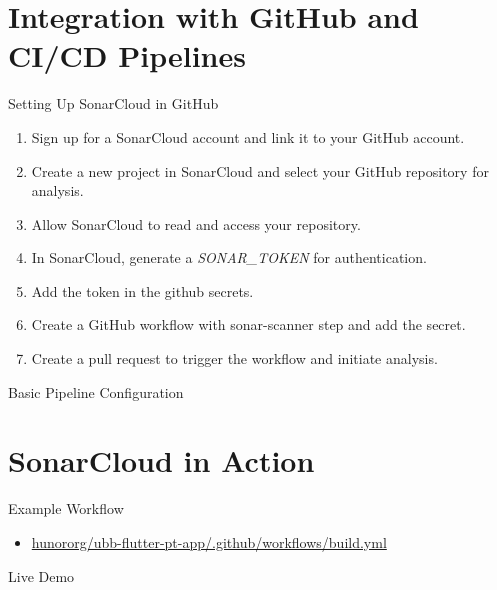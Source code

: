\documentclass{beamer}
\begin{document}
\section[ Integration with GitHub and CI/CD Pipelines]{Integration with GitHub and CI/CD Pipelines}

\begin{frame}{Setting Up SonarCloud in GitHub}
  
  \begin{enumerate}
    \item Sign up for a SonarCloud account and link it to your GitHub account.
    \item Create a new project in SonarCloud and select your GitHub repository for analysis.
    \item Allow SonarCloud to read and access your repository.
    \item In SonarCloud, generate a \small{\textit{SONAR\_TOKEN}} \normalsize for authentication.
    \item Add the token in the github secrets.
    \item Create a GitHub workflow with sonar-scanner step and add the secret.
    \item Create a pull request to trigger the workflow and initiate analysis.
  \end{enumerate}

\end{frame}

\begin{frame}{Basic Pipeline Configuration}
 
\end{frame}

\section[SonarCloud in Action]{SonarCloud in Action}

\begin{frame}{Example Workflow}
  \begin{itemize}
    \item \href{https://github.com/hunororg/ubb-flutter-pt-app/blob/main/.github/workflows/build.yml}{hunororg/ubb-flutter-pt-app/.github/workflows/build.yml}
  \end{itemize}
   
\end{frame}

\begin{frame}{Live Demo}
 
\end{frame}
\end{document}
